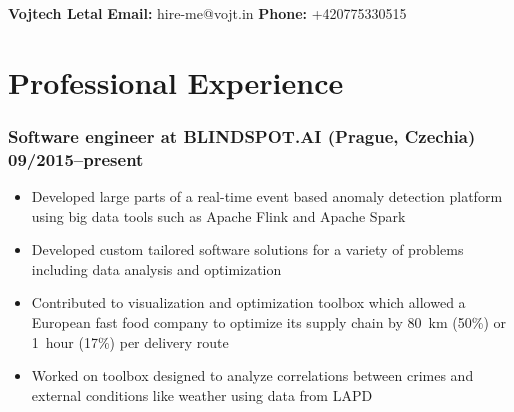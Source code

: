 \documentclass[10pt]{article}
\date{}
\begin{document}
\clearpage
\thispagestyle{empty}
{\center\bfseries\huge Vojtech Letal}
\hfill
{\bf Email:} hire-me@vojt.in
{\bf Phone:} +420775330515


\section*{Professional Experience}
\subsubsection*{\bf Software engineer at BLINDSPOT.AI (Prague, Czechia) \hfill 09/2015--present}
	 \begin{itemize}
		\setlength\itemsep{-0.25em}
		\item Developed large parts of a real-time event based anomaly detection platform using big data tools such as Apache Flink and Apache Spark
		\item Developed custom tailored software solutions for a variety of problems including data analysis and optimization
		\item Contributed to visualization and optimization toolbox which allowed a European fast food company to optimize its supply chain by 80~km (50\%) or 1~hour (17\%) per delivery route
		\item Worked on toolbox designed to analyze correlations between crimes and external conditions like weather using data from LAPD
	 \end{itemize}
\end{document}
